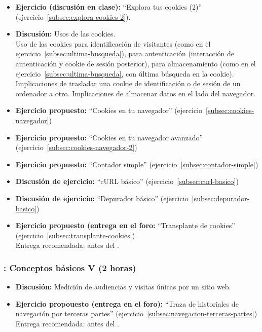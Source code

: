 \documentclass[a4paper,12pt]{article}
\begin{document}
\begin{itemize}
\item \textbf{Ejercicio (discusión en clase):} ``Explora tus cookies (2)'' (ejercicio~\ref{subsec:explora-cookies-2}).
\item \textbf{Discusión:} Usos de las cookies. \\
  Uso de las cookies para identificación de visitantes (como en el ejercicio~\ref{subsec:ultima-busqueda}), para autenticación (interacción de autenticación y cookie de sesión posterior), para almacenamiento (como en el ejercicio~\ref{subsec:ultima-busqueda}, con última búsqueda en la cookie). Implicaciones de trasladar una cookie de identificación o de sesión de un ordenador a otro. Implicaciones de almacenar datos en el lado del navegador.
\item \textbf{Ejercicio propuesto:} ``Cookies en tu navegador'' (ejercicio~\ref{subsec:cookies-navegador}) \\
\item \textbf{Ejercicio propuesto:} ``Cookies en tu navegador avanzado'' (ejercicio~\ref{subsec:cookies-navegador-2}) \\
\item \textbf{Ejercicio propuesto:} ``Contador simple'' (ejercicio~\ref{subsec:contador-simple})
\item \textbf{Discusión de ejercicio:} ``cURL básico'' (ejercicio~\ref{subsec:curl-basico})
\item \textbf{Discusión de ejercicio:} ``Depurador básico'' (ejercicio~\ref{subsec:depurador-basico})
\item \textbf{Ejercicio propuesto (entrega en el foro:} ``Transplante de cookies'' (ejercicio~\ref{subsec:transplante-cookies}) \\
  Entrega recomendada: antes del \juevesE.
\end{itemize}

\subsubsection{\juevesE: Conceptos básicos V (2 horas)}
\label{cal:juevesE}

\begin{itemize}
\item \textbf{Discusión:} Medición de audiencias y visitas únicas por un sitio web.
\item \textbf{Ejercicio propouesto (entrega en el foro):} ``Traza de historiales de navegación por terceras partes'' (ejercicio~\ref{subsec:navegacion-terceras-partes}) \\
  Entrega recomendada: antes del \juevesF.
\end{itemize}
\end{document}

